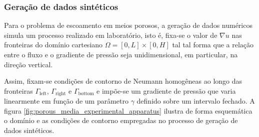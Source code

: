 \newpage
\subsubsection{Geração de dados sintéticos}
Para o problema de escoamento em meios porosos, a geração de dados numéricos simula um processo realizado em laboratório, isto é, fixa-se o valor de $ \nabla u $ nas fronteiras do domínio cartesiano $ \Omega = [0,L] \times [0,H] $ tal tal forma que a relação entre o fluxo e o gradiente de pressão seja unidimensional, em particular, na direção vertical. 

Assim, fixam-se condições de contorno de Neumann homogêneas ao longo das fronteiras $ \Gamma_{\text{left}} $, $ \Gamma_{\text{right}} $ e $ \Gamma_{\text{bottom}} $ e impõe-se um gradiente de pressão que varia linearmente em função de um parâmetro $ \gamma $ definido sobre um intervalo fechado.  A figura \ref{fig:porous_media_experimental_apparatus} ilustra de forma esquemática o domínio e as condições de contorno empregadas no processo de geração de dados sintéticos. 


